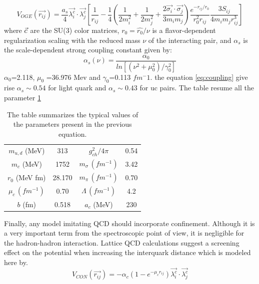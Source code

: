 \documentclass[12pt,a4paper]{book}
\begin{document}
	\begin{equation}
		V_{OGE}(\vec{r_{ij}}) = \frac{a_s}{4} \vec{\lambda_i^c} \cdot \vec{\lambda_j^c} \left[ \frac{1}{r_{ij}}- \frac{1}{4} \left(\frac{1}{2m_i^2} + \frac{1}{2m_j^2} + \frac{2 \vec{\sigma_i} \cdot \vec{\sigma_j}}{3 m_i m_j} \right) \frac{e^{-r_{ij}/r_0}}{r_0^2 r_{ij}} \frac{3 S_{ij}}{4m_i m_j r_{ij}^3} \right]
		\label{eq:one-gluon-exchange-potential}
	\end{equation}
	where $\vec{\label^c}$ are the SU(3) color matrices, $r_0= \hat{r_0}/\nu$ is a flavor-dependent regularization scaling	with the reduced mass $\nu$ of the interacting pair, and $\alpha_s$ is the scale-dependent strong coupling constant given by:
	\begin{equation}
		\alpha_s(\nu)= \frac{\alpha_0}{ln[(\nu^2+\mu_0^2)/\gamma_0^2]}
		\label{eq:coupling}
	\end{equation}
	$\alpha_0$=2.118, $\mu_0$ =36.976 Mev and $\gamma_0$=0.113 $fm^-1$. the  equation \ref{eq:coupling} give rise $\alpha_s \sim 0.54$ for light quark and $\alpha_s \sim 0.43$ for uc pairs. The table resume all the parameter \ref{tab:par-resume}
	
	\begin{table}[h]
		\centering
		\begin{tabular}{|c c | c c|}
			$m_{u,d}$ (MeV) & 313 & $g_{ch}^2 / 4\pi$ & 0.54 \\
			$m_{c}$ (MeV) & 1752 & $m_{\sigma} \, (fm^{-1})$ & 3.42 \\
			$\hat{r_0}$ (MeV fm) & 28.170 &  $m_{\pi} \, (fm^{-1})$ & 0.70 \\
			$\mu_c \, (fm^{-1})$ & 0.70 & $\Lambda \, (fm^{-1})$ & 4.2 \\
			$b$ (fm) & 0.518 & $a_c$ (MeV) & 230 \\
		\end{tabular}
		\caption{The table summarizes the typical values of the parameters present in the previous equation.}
		\label{tab:par-resume}
	\end{table}
	
	Finally, any model imitating QCD should incorporate confinement. Although it is a very important term from the spectroscopic point of view, it is negligible for the hadron-hadron interaction. Lattice QCD calculations suggest a screening effect on the potential when increasing the interquark distance which is modeled here by.
	\begin{equation}
		V_{CON}(\vec{r_{ij}})= -\alpha_c (1-e^{-\mu_c r_{ij}}) \vec{\lambda_i^c} \cdot \vec{\lambda_j^c}
		\label{eq:confinement}
	\end{equation}
	
\end{document}
